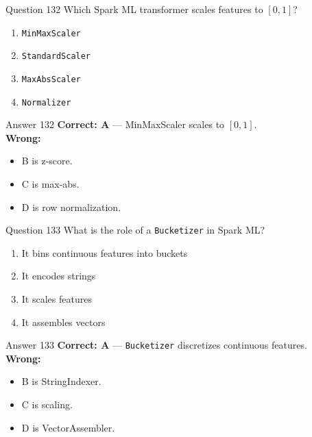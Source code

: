 \documentclass[aspectratio=169,11pt]{beamer}
\begin{document}
	\begin{frame}{Question 132}
		Which Spark ML transformer scales features to $[0,1]$?
		\begin{enumerate}[label=\Alph*.]
			\item \texttt{MinMaxScaler}
			\item \texttt{StandardScaler}
			\item \texttt{MaxAbsScaler}
			\item \texttt{Normalizer}
		\end{enumerate}
	\end{frame}
	\begin{frame}{Answer 132}
		\textbf{Correct: A} --- MinMaxScaler scales to $[0,1]$.\\
		\vspace{0.5em}
		\textbf{Wrong:}
		\begin{itemize}
			\item B is z-score.
			\item C is max-abs.
			\item D is row normalization.
		\end{itemize}
	\end{frame}
	
	\begin{frame}{Question 133}
		What is the role of a \texttt{Bucketizer} in Spark ML?
		\begin{enumerate}[label=\Alph*.]
			\item It bins continuous features into buckets
			\item It encodes strings
			\item It scales features
			\item It assembles vectors
		\end{enumerate}
	\end{frame}
	\begin{frame}{Answer 133}
		\textbf{Correct: A} --- \texttt{Bucketizer} discretizes continuous features.\\
		\vspace{0.5em}
		\textbf{Wrong:}
		\begin{itemize}
			\item B is StringIndexer.
			\item C is scaling.
			\item D is VectorAssembler.
		\end{itemize}
	\end{frame}
	
\end{document}
